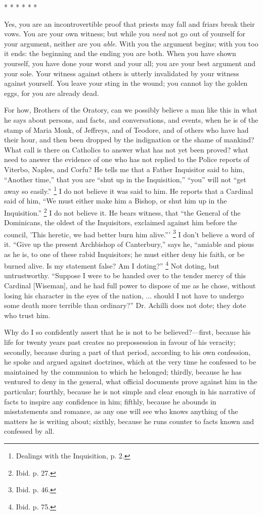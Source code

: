 *
* *
* *
*

Yes, you are an incontrovertible proof that priests
may fall and friars break their vows. You are your own
witness; but while you \emph{need} not go out of
yourself for your argument, neither are you \emph{able}.
With you the argument begins; with you too it ends: the
beginning and the ending you are both. When you have
shown yourself, you have done your worst and your all;
you are your best argument and your sole. Your witness
against others is utterly invalidated by your witness
against yourself. You leave your sting in the wound; you
cannot lay the golden eggs, for you are already dead.

For how, Brothers of the Oratory, can we possibly
believe a man like this in what he says about persons,
and facts, and conversations, and events, when he is of
the stamp of Maria Monk, of Jeffreys, and of Teodore, and
of others who have had their hour, and then been dropped
by the indignation or the shame of mankind? What call is
there on Catholics to answer what has not yet been
proved? what need to answer the evidence of one who has
not replied to the Police reports of Viterbo, Naples, and
Corfu? He tells me that a Father Inquisitor said to him,
``Another time,'' that you are ``shut up in
the Inquisition,'' ``you'' will not ``get
away so easily.'' \footnote{Dealings with the Inquisition,
p. 2.} I do not believe it was said
to him. He reports that a Cardinal said of him, ``We
must either make him a Bishop, or shut him up in the
Inquisition.'' \footnote{Ibid. p. 27.} I do not believe it. He bears
witness, that ``the General of the Dominicans, the
oldest of the Inquisitors, exclaimed against him before
the council, 'This heretic, we had better burn him
alive.''' \footnote{Ibid. p. 46.} I don't believe a word of it. ``Give up the
present Archbishop of Canterbury,'' says he,
``amiable and pious as he is, to one of these rabid
Inquisitors; he must either deny his faith, or be burned
alive. Is my statement false? Am I doting?'' \footnote{Ibid. p. 75.} Not
doting, but untrustworthy. ``Suppose I were to be
handed over to the tender mercy of this Cardinal
[Wiseman], and he had full power to dispose of me as he
chose, without losing his character in the eyes of the
nation, ... should I not have to undergo some death more
terrible than ordinary?'' Dr. Achilli does not dote;
they dote who trust him.

Why do I so confidently assert that he is not to be
believed?—first, because his life for twenty years
past creates no prepossession in favour of his veracity;
secondly, because during a part of that period, according
to his own confession, he spoke and argued against
doctrines, which at the very time he confessed to be
maintained by the communion to which he belonged;
thirdly, because he has ventured to deny in the general,
what official documents prove against him in the
particular; fourthly, because he is not simple and clear
enough in his narrative of facts to inspire any
confidence in him; fifthly, because he abounds in
misstatements and romance, as any one will see who knows
anything of the matters he is writing about; sixthly,
because he runs counter to facts known and confessed by
all.

